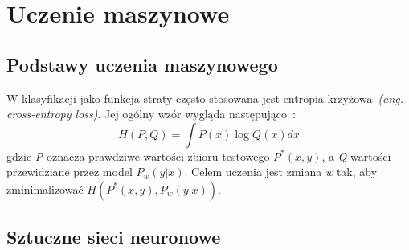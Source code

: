 \chapter{Uczenie maszynowe}\label{ch:uczenie-maszynowe}

\section{Podstawy uczenia maszynowego}\label{sec:podstawy-uczenia-maszynowego}


W klasyfikacji jako funkcja straty często stosowana jest entropia krzyżowa~\textit{(ang. cross-entropy loss)}.
Jej ogólny wzór wygląda następująco~\cite{Russell2020}:
\[H(P,Q) = \int P(x) \log Q(x)dx\]
gdzie \textit{P} oznacza prawdziwe wartości zbioru testowego \textit{\(P^*(x, y)\)}, a \textit{Q} wartości przewidziane przez model \textit{\(P_w(y | x)\)}.
Celem uczenia jest zmiana \textit{w} tak, aby zminimalizować \(H(P^*(x, y),P_w(y | x))\).

\section{Sztuczne sieci neuronowe}\label{sec:sztuczne-sieci-neuronowe}
